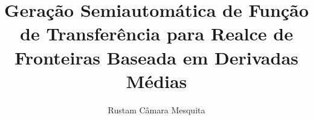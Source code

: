\documentclass[
master,
brazilian
]{ThesisPUC_back}
\author{Rustam Câmara Mesquita}
\title{Geração Semiautomática de Função de Transferência para Realce de Fronteiras Baseada em Derivadas Médias}
\begin{document}
%  






  \arial
  
  \normalfont
%  
\end{document}
